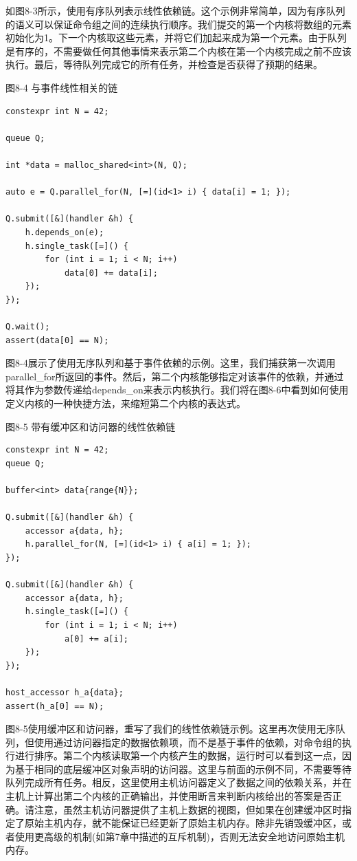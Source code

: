 如图8-3所示，使用有序队列表示线性依赖链。这个示例非常简单，因为有序队列的语义可以保证命令组之间的连续执行顺序。我们提交的第一个内核将数组的元素初始化为1。下一个内核取这些元素，并将它们加起来成为第一个元素。由于队列是有序的，不需要做任何其他事情来表示第二个内核在第一个内核完成之前不应该执行。最后，等待队列完成它的所有任务，并检查是否获得了预期的结果。\par

\hspace*{\fill} \par %
图8-4 与事件线性相关的链
\begin{lstlisting}[caption={}]
constexpr int N = 42;

queue Q;

int *data = malloc_shared<int>(N, Q);

auto e = Q.parallel_for(N, [=](id<1> i) { data[i] = 1; });

Q.submit([&](handler &h) {
	h.depends_on(e);
	h.single_task([=]() {
		for (int i = 1; i < N; i++)
			data[0] += data[i];
	});
});

Q.wait();
assert(data[0] == N);
\end{lstlisting}

图8-4展示了使用无序队列和基于事件依赖的示例。这里，我们捕获第一次调用parallel\_for所返回的事件。然后，第二个内核能够指定对该事件的依赖，并通过将其作为参数传递给depends\_on来表示内核执行。我们将在图8-6中看到如何使用定义内核的一种快捷方法，来缩短第二个内核的表达式。\par

\hspace*{\fill} \par %
图8-5 带有缓冲区和访问器的线性依赖链
\begin{lstlisting}[caption={}]
constexpr int N = 42;
queue Q;

buffer<int> data{range{N}};

Q.submit([&](handler &h) {
	accessor a{data, h};
	h.parallel_for(N, [=](id<1> i) { a[i] = 1; });
});

Q.submit([&](handler &h) {
	accessor a{data, h};
	h.single_task([=]() {
		for (int i = 1; i < N; i++)
			a[0] += a[i];
	});
});

host_accessor h_a{data};
assert(h_a[0] == N);
\end{lstlisting}

图8-5使用缓冲区和访问器，重写了我们的线性依赖链示例。这里再次使用无序队列，但使用通过访问器指定的数据依赖项，而不是基于事件的依赖，对命令组的执行进行排序。第二个内核读取第一个内核产生的数据，运行时可以看到这一点，因为基于相同的底层缓冲区对象声明的访问器。这里与前面的示例不同，不需要等待队列完成所有任务。相反，这里使用主机访问器定义了数据之间的依赖关系，并在主机上计算出第二个内核的正确输出，并使用断言来判断内核给出的答案是否正确。请注意，虽然主机访问器提供了主机上数据的视图，但如果在创建缓冲区时指定了原始主机内存，就不能保证已经更新了原始主机内存。除非先销毁缓冲区，或者使用更高级的机制(如第7章中描述的互斥机制)，否则无法安全地访问原始主机内存。\par

